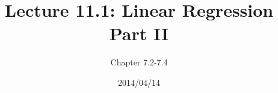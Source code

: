 \documentclass[slides]{beamer}
\title{Lecture 11.1: Linear Regression Part II}
\author{Chapter 7.2-7.4}
\date{2014/04/14}
\newcommand{\blue}[1]{\textcolor{blue2}{#1}}
\begin{document}
\begin{frame}
\titlepage
\end{frame}


%
%


%
%
%
\end{document}
